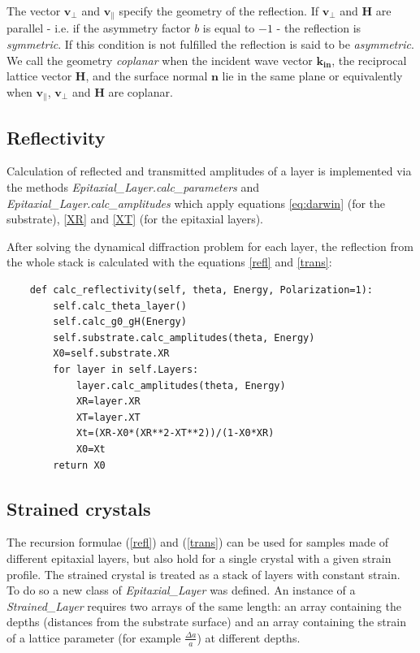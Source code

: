 \documentclass[12pt,oneside,notitlepage,abstracton,a4paper]{scrartcl}
\begin{document}
The vector $\mathbf{v_\perp}$ and $\mathbf{v_\parallel}$ specify the geometry of the reflection.
If $\mathbf{v_\perp}$ and $\mathbf{H}$ are parallel - i.e. if the asymmetry factor $b$ is equal to $-1$ - the reflection is \textit{symmetric}. If this condition is not fulfilled the reflection is said to be \textit{asymmetric}.
We call the geometry \textit{coplanar} when the incident wave vector $\mathbf{k_{in}}$, the reciprocal lattice vector $\mathbf{H}$, and the surface normal $\mathbf{n}$ lie in the same plane or equivalently when $\mathbf{v_\parallel}$, $\mathbf{v_\perp}$ and $\mathbf{H}$ are coplanar.



\subsection{Reflectivity}
Calculation of reflected and transmitted amplitudes of a layer is implemented via the methods \textit{Epitaxial\_Layer.calc\_parameters} and \textit{Epitaxial\_Layer.calc\_amplitudes} which apply equations \ref{eq:darwin} (for the substrate), \ref{XR} and \ref{XT} (for the epitaxial layers).

After solving the dynamical diffraction problem for each layer, the reflection from the whole stack is calculated with the equations \ref{refl} and \ref{trans}:
\begin{lstlisting}
    def calc_reflectivity(self, theta, Energy, Polarization=1):
        self.calc_theta_layer()
        self.calc_g0_gH(Energy)
        self.substrate.calc_amplitudes(theta, Energy)
        X0=self.substrate.XR
        for layer in self.Layers:
            layer.calc_amplitudes(theta, Energy)
            XR=layer.XR
            XT=layer.XT
            Xt=(XR-X0*(XR**2-XT**2))/(1-X0*XR)
            X0=Xt
        return X0
\end{lstlisting}


\subsection{Strained crystals} \label{strcr}
The recursion formulae (\ref{refl}) and (\ref{trans}) can be used for samples made of different epitaxial layers, but also hold for a single crystal with a given strain profile. The strained crystal is treated as a stack of layers with constant strain. To do so a new class of \textit{Epitaxial\_Layer} was defined. An instance of a \textit{Strained\_Layer} requires two arrays of the same length: an array containing the depths (distances from the substrate surface) and an array containing the strain of a lattice parameter (for example $\frac{\Delta a}{a}$) at different depths.
\end{document}
